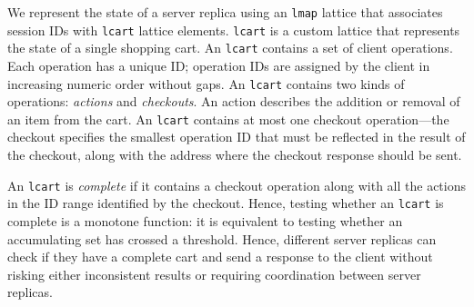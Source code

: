 
We represent the state of a server replica using an \texttt{lmap} lattice that
associates session IDs with \texttt{lcart} lattice elements. \texttt{lcart} is a
custom lattice that represents the state of a single shopping cart. An
\texttt{lcart} contains a set of client operations. Each operation has a unique
ID; operation IDs are assigned by the client in increasing numeric order without
gaps. An \texttt{lcart} contains two kinds of operations: \emph{actions} and
\emph{checkouts}. An action describes the addition or removal of an item from
the cart. An \texttt{lcart} contains at most one checkout operation---the
checkout specifies the smallest operation ID that must be reflected in the
result of the checkout, along with the address where the checkout response
should be sent.

An \texttt{lcart} is \emph{complete} if it contains a checkout operation along
with all the actions in the ID range identified by the checkout. Hence, testing
whether an \texttt{lcart} is complete is a monotone function: it is equivalent
to testing whether an accumulating set has crossed a threshold. Hence, different
server replicas can check if they have a complete cart and send a response to
the client without risking either inconsistent results or requiring coordination
between server replicas.


